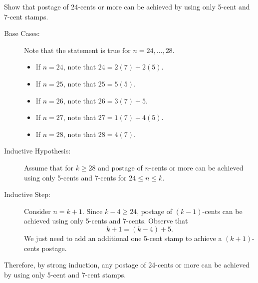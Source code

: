 \documentclass{article}
\theoremstyle{definition}
\begin{document}
\begin{question}
    Show that postage of 24-cents or more can be achieved by using only 5-cent and 7-cent stamps.
\end{question}
\begin{solution}
	\begin{description}
	\item[Base Cases: ] Note that the statement is true for $n=24, \dots, 28$.
	\begin{itemize}
	\item If $n=24$, note that $24 = 2 (7) + 2(5).$
	\item If $n=25$, note that $25 = 5 (5).$
	\item If $n=26$, note that $26 = 3 (7) + 5$.
	\item If $n=27$, note that $27 = 1 (7) + 4(5).$
	\item If $n=28$, note that $28 = 4 (7).$
	\end{itemize}
	
	\item[Inductive Hypothesis: ] Assume that for $k\geq 28$ and postage of $n$-cents or more can be achieved using only 5-cents and 7-cents for $24\leq n\leq k$.
	
	\item[Inductive Step: ] Consider $n=k+1$.  Since $k-4\geq 24$, postage of $(k-1)$-cents can be achieved using only 5-cents and 7-cents. Observe that 
	\[ k+1 = (k-4)+5.\]
	We just need to add an additional one 5-cent stamp to achieve a $(k+1)$-cents postage.
	\end{description}
	Therefore, by strong induction, any postage of 24-cents or more can be achieved by using only 5-cent and 7-cent stamps.
\end{solution}
\end{document}
